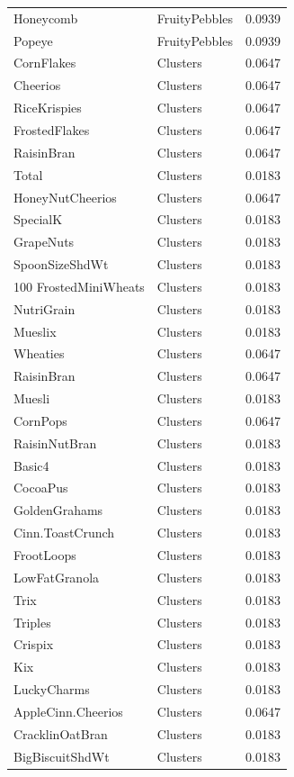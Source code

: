 \begin{longtable}{llr}
Honeycomb & FruityPebbles & 0.0939 \\
Popeye & FruityPebbles & 0.0939 \\
CornFlakes & Clusters & 0.0647 \\
Cheerios & Clusters & 0.0647 \\
RiceKrispies & Clusters & 0.0647 \\
FrostedFlakes & Clusters & 0.0647 \\
RaisinBran & Clusters & 0.0647 \\
Total & Clusters & 0.0183 \\
HoneyNutCheerios & Clusters & 0.0647 \\
SpecialK & Clusters & 0.0183 \\
GrapeNuts & Clusters & 0.0183 \\
SpoonSizeShdWt & Clusters & 0.0183 \\
100%
FrostedMiniWheats & Clusters & 0.0183 \\
NutriGrain & Clusters & 0.0183 \\
Mueslix & Clusters & 0.0183 \\
Wheaties & Clusters & 0.0647 \\
RaisinBran & Clusters & 0.0647 \\
Muesli & Clusters & 0.0183 \\
CornPops & Clusters & 0.0647 \\
RaisinNutBran & Clusters & 0.0183 \\
Basic4 & Clusters & 0.0183 \\
CocoaPus & Clusters & 0.0183 \\
GoldenGrahams & Clusters & 0.0183 \\
Cinn.ToastCrunch & Clusters & 0.0183 \\
FrootLoops & Clusters & 0.0183 \\
LowFatGranola & Clusters & 0.0183 \\
Trix & Clusters & 0.0183 \\
Triples & Clusters & 0.0183 \\
Crispix & Clusters & 0.0183 \\
Kix & Clusters & 0.0183 \\
LuckyCharms & Clusters & 0.0183 \\
AppleCinn.Cheerios & Clusters & 0.0647 \\
CracklinOatBran & Clusters & 0.0183 \\
BigBiscuitShdWt & Clusters & 0.0183 \\

\end{longtable}
